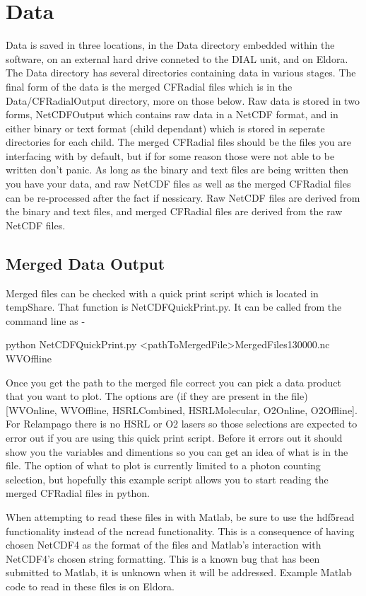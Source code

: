 
\chapter{Data}
\label{CH-Data}

Data is saved in three locations, in the Data directory embedded within the software, on an external hard drive conneted to the DIAL unit, and on Eldora. The Data directory has several directories containing data in various stages. The final form of the data is the merged CFRadial files which is in the Data/CFRadialOutput directory, more on those below. Raw data is stored in two forms, NetCDFOutput which contains raw data in a NetCDF format, and in either binary or text format (child dependant) which is stored in seperate directories for each child. The merged CFRadial files should be the files you are interfacing with by default, but if for some reason those were not able to be written don't panic. As long as the binary and text files are being written then you have your data, and raw NetCDF files as well as the merged CFRadial files can be re-processed after the fact if nessicary. Raw NetCDF files are derived from the binary and text files, and merged CFRadial files are derived from the raw NetCDF files. 

\section{Merged Data Output}
\label{Sec-DATAOutput}

Merged files can be checked with a quick print script which is located in tempShare. That function is NetCDFQuickPrint.py. It can be called from the command line as - 

python NetCDFQuickPrint.py <pathToMergedFile>MergedFiles130000.nc WVOffline

Once you get the path to the merged file correct you can pick a data product that you want to plot. The options are (if they are present in the file) [WVOnline, WVOffline, HSRLCombined, HSRLMolecular, O2Online, O2Offline]. For Relampago there is no HSRL or O2 lasers so those selections are expected to error out if you are using this quick print script. Before it errors out it should show you the variables and dimentions so you can get an idea of what is in the file. The option of what to plot is currently limited to a photon counting selection, but hopefully this example script allows you to start reading the merged CFRadial files in python. 

When attempting to read these files in with Matlab, be sure to use the hdf5read functionality instead of the ncread functionality. This is a consequence of having chosen NetCDF4 as the format of the files and Matlab's interaction with NetCDF4's chosen string formatting. This is a known bug that has been submitted to Matlab, it is unknown when it will be addressed. Example Matlab code to read in these files is on Eldora. 
